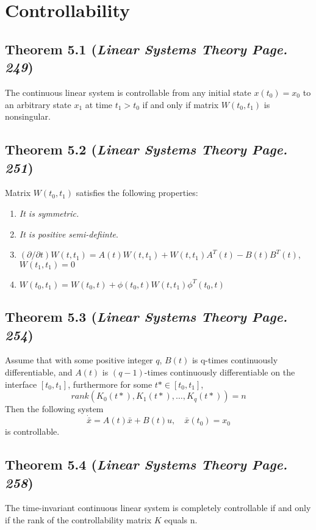\documentclass[12pt]{article}
\begin{document}
\section{Controllability}
\subsection*{Theorem 5.1 ({\em Linear Systems Theory Page. 249})}
The continuous linear system is controllable from any initial state $x(t_0)=x_0$ to an arbitrary state $x_1$ at time $t_1>t_0$ if and only if matrix $W(t_0,t_1)$ is nonsingular.

\subsection*{Theorem 5.2 ({\em Linear Systems Theory Page. 251})}
Matrix $W(t_0,t_1)$ satisfies the following properties:
\renewcommand{\labelenumiii}{\Roman{enumii}}
\begin{enumerate}
  \item {\em It is symmetric.}
  \item {\em It is positive semi-defiinte}. 
  \item $(\partial/\partial t)W(t,t_1)=A(t)W(t,t_1)+W(t,t_1)A^T(t)-B(t)B^T(t)$, \\$W(t_1,t_1)=0$
  \item $W(t_0,t_1)=W(t_0,t)+\phi(t_0,t)W(t,t_1)\phi^T(t_0,t)$
\end{enumerate}

\subsection*{Theorem 5.3 ({\em Linear Systems Theory Page. 254})}
Assume that with some positive integer $q$, $B(t)$ is q-times continuously differentiable, and $A(t)$ is $(q-1)$-times continuously differentiable on the interface $[t_0,t_1]$, furthermore for some $t*\in [t_0,t_1]$,
$$rank(K_0(t*),K_1(t*),\dots,K_q(t*))=n$$
Then the following system
$$\dot{\bar{x}}=A(t)\bar{x}+B(t)u,\quad \bar{x}(t_0)=x_0$$
is controllable. 

\subsection*{Theorem 5.4 ({\em Linear Systems Theory Page. 258})}
The time-invariant continuous linear system is completely controllable if and only if the rank of the controllability matrix $K$ equals n.
\end{document}
